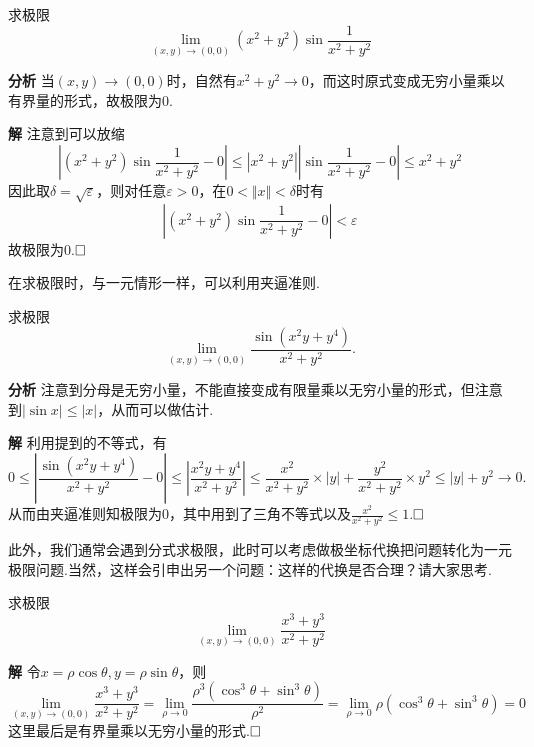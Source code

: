 \documentclass{ctexart}
\newenvironment{custom}[1]{\par\noindent \textbf{#1}\quad}{\par\vspace{1em}}
\begin{document}
\begin{example}
求极限
$$\lim\limits_{(x,y)\to(0,0)}{(x^{2}+y^{2})\sin{\frac{1}{x^{2}+y^{2}}}}$$
\end{example}

\begin{custom}{分析}
当$(x,y)\to(0,0)$时，自然有$x^{2}+y^{2}\to 0$，而这时原式变成无穷小量乘以有界量的形式，故极限为$0$.
\end{custom}

\begin{custom}{解}
注意到可以放缩
$$|(x^{2}+y^{2})\sin{\frac{1}{x^{2}+y^{2}}}-0|\leqslant|x^{2}+y^{2}||\sin{\frac{1}{x^{2}+y^{2}}}-0|\leqslant x^{2}+y^{2}$$
因此取$\delta=\sqrt{\varepsilon}$，则对任意$\varepsilon>0$，在$0<\Vert x\Vert<\delta$时有
$$|(x^{2}+y^{2})\sin{\frac{1}{x^{2}+y^{2}}}-0|<\varepsilon$$
故极限为0.$\hfill{\square}$
\end{custom}

在求极限时，与一元情形一样，可以利用夹逼准则.
\begin{example}
求极限$$\lim\limits_{(x,y)\to(0,0)}{\frac{\sin{(x^{2}y+y^{4})}}{x^{2}+y^{2}}}.$$
\end{example}

\begin{custom}{分析}
注意到分母是无穷小量，不能直接变成有限量乘以无穷小量的形式，但注意到$|\sin{x}|\leqslant |x|$，从而可以做估计.
\end{custom}

\begin{custom}{解}
利用提到的不等式，有
$$0\leqslant \left|\frac{\sin{(x^{2}y+y^{4})}}{x^{2}+y^{2}}-0\right|\leqslant \left|\frac{x^{2}y+y^{4}}{x^{2}+y^{2}}\right|\leqslant \frac{x^{2}}{x^{2}+y^{2}}\times |y|+\frac{y^{2}}{x^{2}+y^{2}}\times y^{2}\leqslant |y|+y^{2}\to 0.$$
从而由夹逼准则知极限为$0$，其中用到了三角不等式以及$\frac{x^{2}}{x^{2}+y^{2}}\leqslant 1$.$\hfill{\square}$
\end{custom}

此外，我们通常会遇到分式求极限，此时可以考虑做极坐标代换把问题转化为一元极限问题.当然，这样会引申出另一个问题：这样的代换是否合理？请大家思考.

\begin{example}
求极限
$$\lim\limits_{(x,y)\to(0,0)}{\frac{x^{3}+y^{3}}{x^{2}+y^{2}}}$$
\end{example}

\begin{custom}{解}
令$x=\rho\cos{\theta},y=\rho\sin{\theta}$，则
$$\lim\limits_{(x,y)\to(0,0)}{\frac{x^{3}+y^{3}}{x^{2}+y^{2}}}=\lim\limits_{\rho\to 0}{\frac{\rho^{3}(\cos^{3}\theta+\sin^{3}\theta)}{\rho^{2}}}=\lim\limits_{\rho\to 0}\rho(\cos^{3}\theta+\sin^{3}\theta)=0$$
这里最后是有界量乘以无穷小量的形式.$\hfill{\square}$
\end{custom}
\end{document}
